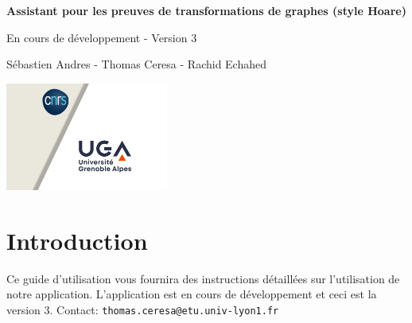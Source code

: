 \documentclass[11pt,a4paper]{article}
\begin{document}
\begin{titlepage}
    
    \vspace*{6cm}
    
    \begin{center}
        {\Huge\bfseries \textcolor{ugablue}{Assistant pour les preuves de transformations de graphes (style Hoare)}}
        
        \vspace{1cm}
        
        {\LARGE \textcolor{ugablue}{En cours de développement - Version 3}}
        
        \vspace{2cm}
        
        {\Large \textcolor{ugablue}{Sébastien Andres - Thomas Ceresa - Rachid Echahed}}
        
        \vfill
        
        \includegraphics[width=0.4\textwidth]{uga.png}
    \end{center}
    
\end{titlepage}

\tableofcontents

\newpage

\section{Introduction}
Ce guide d'utilisation vous fournira des instructions détaillées sur l'utilisation de notre application. L'application est en cours de développement et ceci est la version 3. Contact: \texttt{thomas.ceresa@etu.univ-lyon1.fr}
\end{document}
